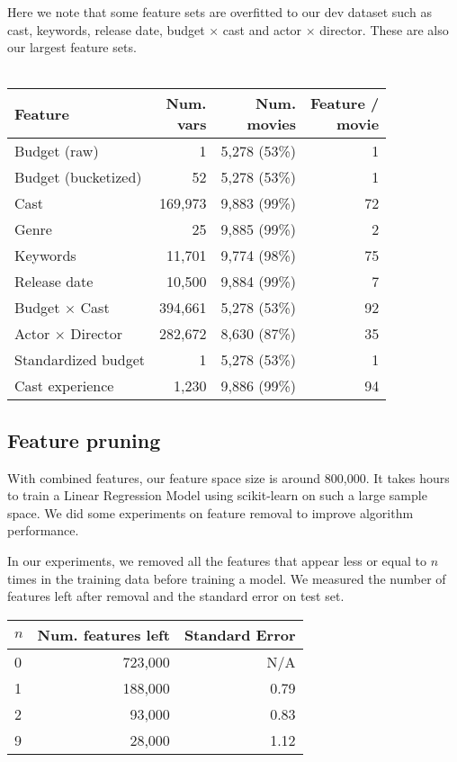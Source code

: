 \documentclass[journal]{IEEEtran}
\begin{document}
\par Here we note that some feature sets are overfitted to our dev dataset such as
cast, keywords, release date, budget $\times$ cast and actor $\times$ director.
These are also our largest feature sets.\\
\\
\begin{tabular}{|l| r r r|} %
\hline
Feature             & \shortstack[c]{Num.\\vars} & \shortstack[c]{Num.\\movies} & \shortstack[c]{Feature / \\ movie}  \\ [0.5ex] %
\hline
Budget (raw)        & 1 & 5,278 (53\%) & 1 \\ %
Budget (bucketized) & 52 & 5,278 (53\%) & 1 \\
Cast                & 169,973 & 9,883 (99\%) & 72 \\
Genre               & 25 & 9,885 (99\%) & 2 \\
Keywords            & 11,701 & 9,774 (98\%) & 75 \\
Release date        & 10,500 & 9,884 (99\%) & 7 \\
\hline
Budget $\times$ Cast & 394,661 & 5,278 (53\%) & 92 \\
Actor $\times$ Director & 282,672 & 8,630 (87\%) & 35 \\
\hline
Standardized budget & 1 & 5,278 (53\%) & 1 \\
Cast experience & 1,230 & 9,886 (99\%) & 94 \\
\hline %
\end{tabular}

\subsection{Feature pruning}
With combined features, our feature space size is around 800,000. It takes hours to train a Linear Regression Model using scikit-learn \cite{scikit} on such a large sample space. We did some experiments on feature removal to improve algorithm performance.
\par In our experiments, we removed all the features that appear less or equal to $n$ times in the training data before training a model. We measured the number of features left after removal and the standard error on test set.\\
\begin{center}
\begin{tabular}{|l| r r|} %
\hline
$n$ & Num. features left & Standard Error  \\ [0.5ex] %
\hline
0 & 723,000 & N/A \\
1 & 188,000 & 0.79 \\
2 & 93,000  & 0.83 \\
9 & 28,000  & 1.12 \\
\hline %
\end{tabular}
\end{center}
\smallskip
\end{document}
